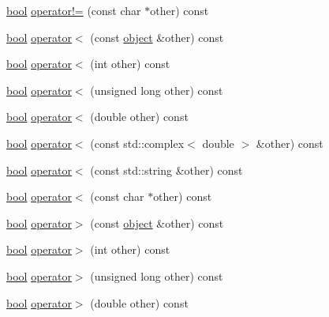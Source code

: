 \begin{DoxyCompactItemize}
\item 
\hyperlink{compiler_8h_abb452686968e48b67397da5f97445f5b}{bool} \hyperlink{classpy_1_1object_afa3e4dc10552d5546190326e8eb62d4a}{operator!=} (const char $\ast$other) const 
\item 
\hyperlink{compiler_8h_abb452686968e48b67397da5f97445f5b}{bool} \hyperlink{classpy_1_1object_a5c39027c6010b53b67340b956f3e23c6}{operator$<$} (const \hyperlink{classpy_1_1object}{object} \&other) const 
\item 
\hyperlink{compiler_8h_abb452686968e48b67397da5f97445f5b}{bool} \hyperlink{classpy_1_1object_a78014689c5af42ea09207ab1277c8e19}{operator$<$} (int other) const 
\item 
\hyperlink{compiler_8h_abb452686968e48b67397da5f97445f5b}{bool} \hyperlink{classpy_1_1object_a52dce4724edd8e4e18864f2fd9379e98}{operator$<$} (unsigned long other) const 
\item 
\hyperlink{compiler_8h_abb452686968e48b67397da5f97445f5b}{bool} \hyperlink{classpy_1_1object_ab6ccfb65dbd60c82764850fb5ad051df}{operator$<$} (double other) const 
\item 
\hyperlink{compiler_8h_abb452686968e48b67397da5f97445f5b}{bool} \hyperlink{classpy_1_1object_a40d0b15c1f398d0a41e42831996abfaf}{operator$<$} (const std\+::complex$<$ double $>$ \&other) const 
\item 
\hyperlink{compiler_8h_abb452686968e48b67397da5f97445f5b}{bool} \hyperlink{classpy_1_1object_a359e35d88d1f9bf6b24c3816b0f41b99}{operator$<$} (const std\+::string \&other) const 
\item 
\hyperlink{compiler_8h_abb452686968e48b67397da5f97445f5b}{bool} \hyperlink{classpy_1_1object_ad088f7c4e7fe18a02977761d7f2a04b7}{operator$<$} (const char $\ast$other) const 
\item 
\hyperlink{compiler_8h_abb452686968e48b67397da5f97445f5b}{bool} \hyperlink{classpy_1_1object_ab194d0a1cda39573394a2195ce8a7075}{operator$>$} (const \hyperlink{classpy_1_1object}{object} \&other) const 
\item 
\hyperlink{compiler_8h_abb452686968e48b67397da5f97445f5b}{bool} \hyperlink{classpy_1_1object_a276c5a791de8c60778984c84b3583964}{operator$>$} (int other) const 
\item 
\hyperlink{compiler_8h_abb452686968e48b67397da5f97445f5b}{bool} \hyperlink{classpy_1_1object_a5d4938b10edc5dcca153e561d26323b8}{operator$>$} (unsigned long other) const 
\item 
\hyperlink{compiler_8h_abb452686968e48b67397da5f97445f5b}{bool} \hyperlink{classpy_1_1object_a219a35018241c2c1fbf2684230b26f70}{operator$>$} (double other) const 

\end{DoxyCompactItemize}
